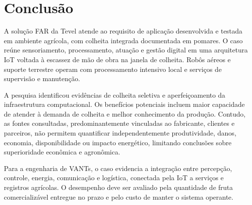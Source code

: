 \section{Conclusão}

A solução \ac{FAR} da Tevel atende ao requisito de aplicação desenvolvida e testada em ambiente agrícola, com colheita integrada documentada em pomares. O caso reúne sensoriamento, processamento, atuação e gestão digital em uma arquitetura \ac{IoT} voltada à escassez de mão de obra na janela de colheita. Robôs aéreos e suporte terrestre operam com processamento intensivo local e serviços de supervisão e manutenção.

A pesquisa identificou evidências de colheita seletiva e aperfeiçoamento da infraestrutura computacional. Os benefícios potenciais incluem maior capacidade de atender à demanda de colheita e melhor conhecimento da produção. Contudo, as fontes consultadas, predominantemente vinculadas ao fabricante, clientes e parceiros, não permitem quantificar independentemente produtividade, danos, economia, disponibilidade ou impacto energético, limitando conclusões sobre superioridade econômica e agronômica.

Para a engenharia de \acp{VANT}, o caso evidencia a integração entre percepção, controle, energia, comunicação e logística, conectada pela \ac{IoT} a serviços e registros agrícolas. O desempenho deve ser avaliado pela quantidade de fruta comercializável entregue no prazo e pelo custo de manter o sistema operante.